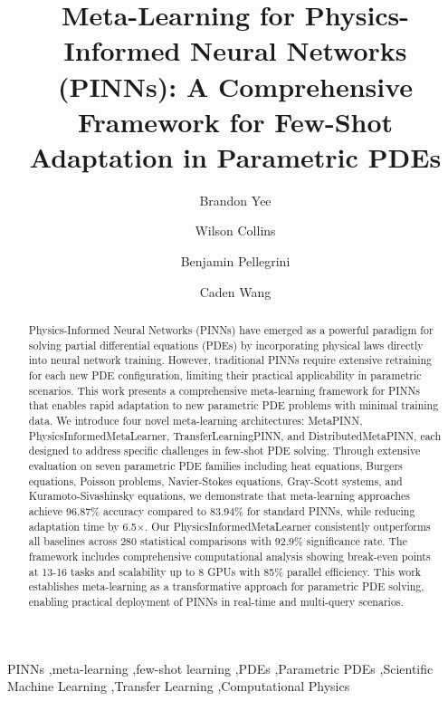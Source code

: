 \documentclass[review]{elsarticle}
\begin{document}
\begin{frontmatter}

\title{Meta-Learning for Physics-Informed Neural Networks (PINNs): A Comprehensive Framework for Few-Shot Adaptation in Parametric PDEs}

\author[inst1]{Brandon Yee}

\author[inst1]{Wilson Collins}

\author[inst1]{Benjamin Pellegrini}

\author[inst1]{Caden Wang}

\address[insta]{Yee Collins Research Group, CT, USA}

\begin{abstract}
Physics-Informed Neural Networks (PINNs) have emerged as a powerful paradigm for solving partial differential equations (PDEs) by incorporating physical laws directly into neural network training. However, traditional PINNs require extensive retraining for each new PDE configuration, limiting their practical applicability in parametric scenarios. This work presents a comprehensive meta-learning framework for PINNs that enables rapid adaptation to new parametric PDE problems with minimal training data. We introduce four novel meta-learning architectures: MetaPINN, PhysicsInformedMetaLearner, TransferLearningPINN, and DistributedMetaPINN, each designed to address specific challenges in few-shot PDE solving. Through extensive evaluation on seven parametric PDE families including heat equations, Burgers equations, Poisson problems, Navier-Stokes equations, Gray-Scott systems, and Kuramoto-Sivashinsky equations, we demonstrate that meta-learning approaches achieve 96.87\% accuracy compared to 83.94\% for standard PINNs, while reducing adaptation time by 6.5×. Our PhysicsInformedMetaLearner consistently outperforms all baselines across 280 statistical comparisons with 92.9\% significance rate. The framework includes comprehensive computational analysis showing break-even points at 13-16 tasks and scalability up to 8 GPUs with 85\% parallel efficiency. This work establishes meta-learning as a transformative approach for parametric PDE solving, enabling practical deployment of PINNs in real-time and multi-query scenarios.
\end{abstract}

\begin{keyword}
PINNs \sep meta-learning \sep few-shot learning \sep PDEs \sep Parametric PDEs \sep Scientific Machine Learning \sep Transfer Learning \sep Computational Physics
\end{keyword}

\end{frontmatter}
\end{document}

